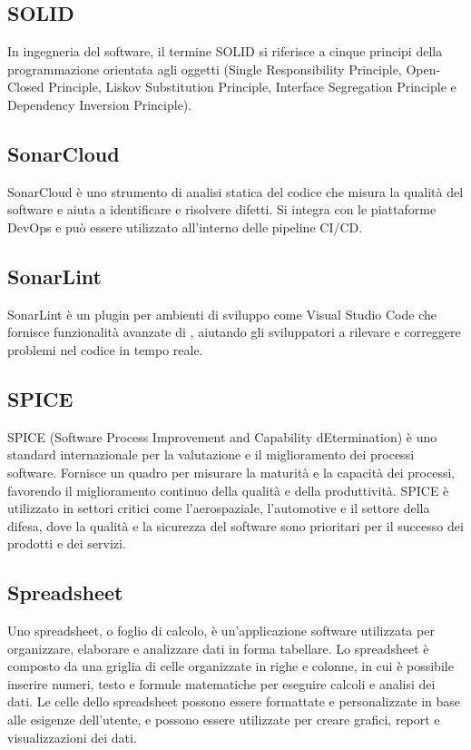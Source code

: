 \vspace{2em}
\subsection*{SOLID}
\par In ingegneria del software, il termine SOLID si riferisce a cinque principi della programmazione orientata agli oggetti (Single Responsibility Principle, Open-Closed Principle, Liskov Substitution Principle, Interface Segregation Principle e Dependency Inversion Principle).

\vspace{2em}
\subsection*{SonarCloud}
\par SonarCloud è uno strumento di analisi statica del codice che misura la qualità del software e aiuta a identificare e risolvere difetti. Si integra con le piattaforme DevOps e può essere utilizzato all'interno delle pipeline CI/CD. 

\vspace{2em}
\subsection*{SonarLint}
\par SonarLint è un plugin per ambienti di sviluppo come Visual Studio Code che fornisce funzionalità avanzate di , aiutando gli sviluppatori a rilevare e correggere problemi nel codice in tempo reale.

\vspace{2em}
\subsection*{SPICE}
\par SPICE (Software Process Improvement and Capability dEtermination) è uno standard internazionale per la valutazione e il miglioramento dei processi software. Fornisce un quadro per misurare la maturità e la capacità dei processi, favorendo il miglioramento continuo della qualità e della produttività. SPICE è utilizzato in settori critici come l'aerospaziale, l'automotive e il settore della difesa, dove la qualità e la sicurezza del software sono prioritari per il successo dei prodotti e dei servizi.

\vspace{2em}
\subsection*{Spreadsheet}
\par Uno spreadsheet, o foglio di calcolo, è un'applicazione software utilizzata per organizzare, elaborare e analizzare dati in forma tabellare. Lo spreadsheet è composto da una griglia di celle organizzate in righe e colonne, in cui è possibile inserire numeri, testo e formule matematiche per eseguire calcoli e analisi dei dati. Le celle dello spreadsheet possono essere formattate e personalizzate in base alle esigenze dell'utente, e possono essere utilizzate per creare grafici, report e visualizzazioni dei dati.

